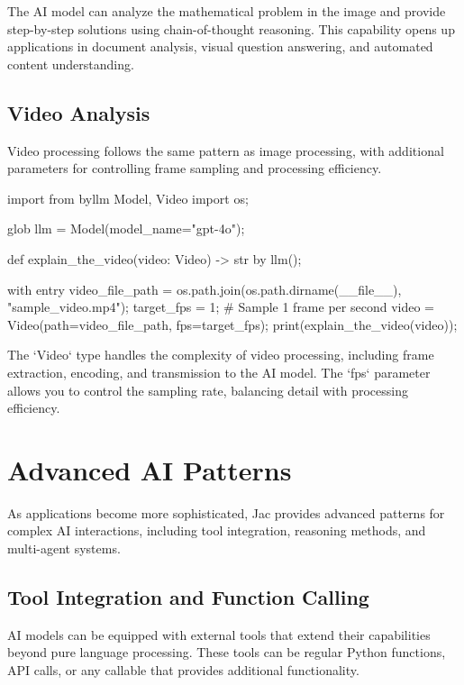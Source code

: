 The AI model can analyze the mathematical problem in the image and provide step-by-step solutions using chain-of-thought reasoning. This capability opens up applications in document analysis, visual question answering, and automated content understanding.

\subsection{Video Analysis}

Video processing follows the same pattern as image processing, with additional parameters for controlling frame sampling and processing efficiency.

\begin{jacblock}
import from byllm { Model, Video }
import os;

glob llm = Model(model_name="gpt-4o");

def explain_the_video(video: Video) -> str by llm();

with entry {
    video_file_path = os.path.join(os.path.dirname(__file__), "sample_video.mp4");
    target_fps = 1;  # Sample 1 frame per second
    video = Video(path=video_file_path, fps=target_fps);
    print(explain_the_video(video));
}
\end{jacblock}

The `Video` type handles the complexity of video processing, including frame extraction, encoding, and transmission to the AI model. The `fps` parameter allows you to control the sampling rate, balancing detail with processing efficiency.

\section{Advanced AI Patterns}

As applications become more sophisticated, Jac provides advanced patterns for complex AI interactions, including tool integration, reasoning methods, and multi-agent systems.

\subsection{Tool Integration and Function Calling}

AI models can be equipped with external tools that extend their capabilities beyond pure language processing. These tools can be regular Python functions, API calls, or any callable that provides additional functionality.

